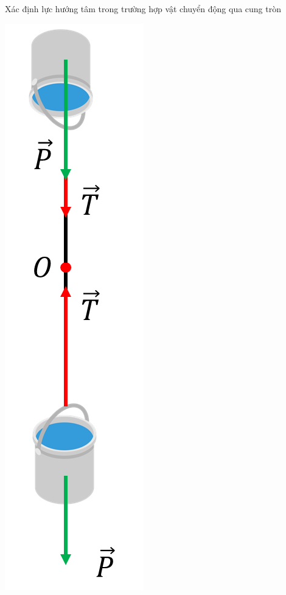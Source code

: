\begin{dang}{Xác định lực hướng tâm trong trường hợp vật chuyển động qua cung tròn}
{\begin{minipage}[l]{0.3\textwidth}
\begin{center}
		\includegraphics[width=0.3\linewidth]{../figs/VN10-2023-PH-TP032-1}
	\end{center}
\end{minipage}
		
}
\end{dang}

